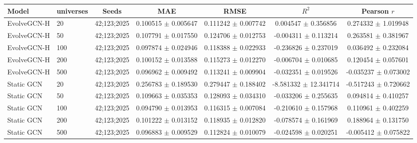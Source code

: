\begin{tabular}{llccccc}
\hline
Model & universes & Seeds & MAE & RMSE & $R^2$ & Pearson $r$ \\
\hline
EvolveGCN-H & 20 & 42;123;2025 & 0.100515 $\pm$ 0.005647 & 0.111242 $\pm$ 0.007742 & 0.004547 $\pm$ 0.356856 & 0.274332 $\pm$ 1.019948 \\
EvolveGCN-H & 50 & 42;123;2025 & 0.107791 $\pm$ 0.017550 & 0.124706 $\pm$ 0.012753 & -0.004311 $\pm$ 0.113214 & 0.263581 $\pm$ 0.381967 \\
EvolveGCN-H & 100 & 42;123;2025 & 0.097874 $\pm$ 0.024946 & 0.118388 $\pm$ 0.022933 & -0.236826 $\pm$ 0.237019 & 0.036492 $\pm$ 0.232084 \\
EvolveGCN-H & 200 & 42;123;2025 & 0.100152 $\pm$ 0.013588 & 0.115273 $\pm$ 0.012270 & -0.006704 $\pm$ 0.010685 & 0.120454 $\pm$ 0.057601 \\
EvolveGCN-H & 500 & 42;123;2025 & 0.096962 $\pm$ 0.009492 & 0.113241 $\pm$ 0.009904 & -0.032351 $\pm$ 0.019526 & -0.035237 $\pm$ 0.073002 \\
Static GCN & 20 & 42;123;2025 & 0.256783 $\pm$ 0.189530 & 0.279447 $\pm$ 0.188402 & -8.581332 $\pm$ 12.341714 & -0.517243 $\pm$ 0.720662 \\
Static GCN & 50 & 42;123;2025 & 0.109663 $\pm$ 0.035353 & 0.128093 $\pm$ 0.034310 & -0.033206 $\pm$ 0.255635 & 0.094814 $\pm$ 0.410257 \\
Static GCN & 100 & 42;123;2025 & 0.094790 $\pm$ 0.013953 & 0.116315 $\pm$ 0.007084 & -0.210610 $\pm$ 0.157968 & 0.110961 $\pm$ 0.402259 \\
Static GCN & 200 & 42;123;2025 & 0.101222 $\pm$ 0.013152 & 0.118935 $\pm$ 0.012820 & -0.078574 $\pm$ 0.161969 & 0.188964 $\pm$ 0.131750 \\
Static GCN & 500 & 42;123;2025 & 0.096883 $\pm$ 0.009529 & 0.112824 $\pm$ 0.010079 & -0.024598 $\pm$ 0.020251 & -0.005412 $\pm$ 0.075822 \\
\hline
\end{tabular}
